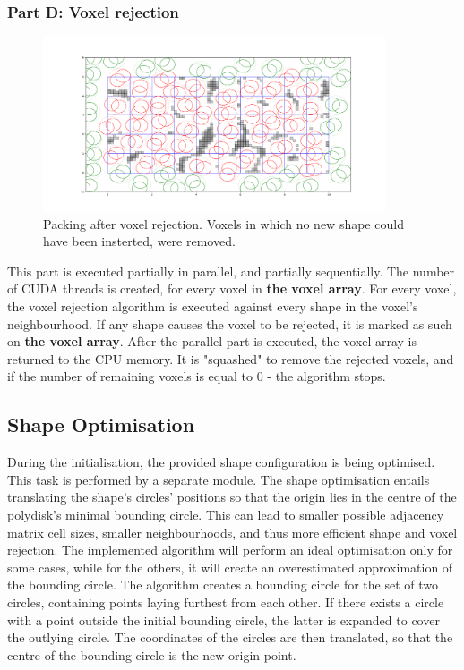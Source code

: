 \documentclass[12pt, oneside]{report}
\begin{document}
\subsubsection{Part D: Voxel rejection}

\begin{figure}[H]
  \centering
	\includegraphics[width=0.9\textwidth,keepaspectratio]{Images/GPURSA/Figure_6.pdf}
	\caption{Packing after voxel rejection. Voxels in which no new shape could have been insterted, were removed.}
	\label{GPURSA_Process_5}
\end{figure}

This part is executed partially in parallel, and partially sequentially. \newline
The number of CUDA threads is created, for every voxel in \textbf{the voxel array}. For every voxel, the voxel rejection algorithm is executed against every shape in the voxel's neighbourhood. If any shape causes the voxel to be rejected, it is marked as such on \textbf{the voxel array}. \newline
After the parallel part is executed, the voxel array is returned to the CPU memory. It is "squashed" to remove the rejected voxels, and if the number of remaining voxels is equal to 0 - the algorithm stops.

\subsection{Shape Optimisation}

During the initialisation, the provided shape configuration is being optimised. This task is performed by a separate module. The shape optimisation entails translating the shape's circles' positions so that the origin lies in the centre of the polydisk's minimal bounding circle. This can lead to smaller possible adjacency matrix cell sizes, smaller neighbourhoods, and thus more efficient shape and voxel rejection. \newline
The implemented algorithm will perform an ideal optimisation only for some cases, while for the others, it will create an overestimated approximation of the bounding circle. The algorithm creates a bounding circle for the set of two circles, containing points laying furthest from each other. If there exists a circle with a point outside the initial bounding circle, the latter is expanded to cover the outlying circle. The coordinates of the circles are then translated, so that the centre of the bounding circle is the new origin point.
\end{document}
